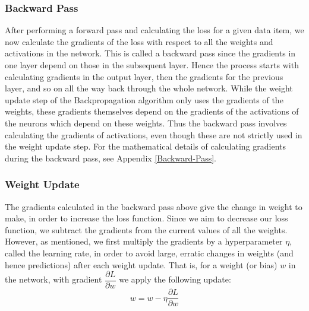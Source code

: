 \documentclass[11pt]{article} %
\theoremstyle{plain}
\theoremstyle{definition}
\begin{document}
\subsubsection{Backward Pass}
After performing a forward pass and calculating the loss for a given data item, we now calculate the gradients of the loss with respect to all the weights and activations in the network. This is called a backward pass since the gradients in one layer depend on those in the subsequent layer. Hence the process starts with calculating gradients in the output layer, then the gradients for the previous layer, and so on all the way back through the whole network. While the weight update step of the Backpropagation algorithm only uses the gradients of the weights, these gradients themselves depend on the gradients of the activations of the neurons which depend on these weights. Thus the backward pass involves calculating the gradients of activations, even though these are not strictly used in the weight update step. For the mathematical details of calculating gradients during the backward pass, see Appendix \ref{Backward-Pass}.

\subsubsection{Weight Update}
The gradients calculated in the backward pass above give the change in weight to make, in order to increase the loss function. Since we aim to decrease our loss function, we subtract the gradients from the current values of all the weights. However, as mentioned, we first multiply the gradients by a hyperparameter \(\eta\), called the learning rate, in order to avoid large, erratic changes in weights (and hence predictions) after each weight update. That is, for a weight (or bias) \(w\) in the network, with gradient \(\dfrac{\partial L}{\partial w}\) we apply the following update:
\[ w = w - \eta \dfrac{\partial L}{\partial w} \]
\end{document}
